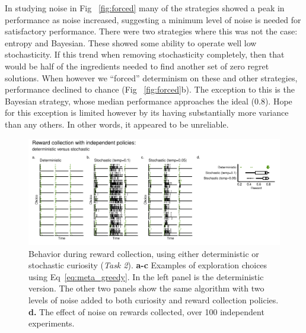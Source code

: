 In studying noise in Fig ~\ref{fig:forced} many of the strategies showed a peak in performance as noise increased, suggesting a minimum level of noise is needed for satisfactory performance. There were two strategies where this was not the case: entropy and Bayesian. These showed some ability to operate well low stochasticity. If this trend when removing stochasticity completely, then that would be half of the ingredients needed to find another set of zero regret solutions. When however we ``forced'' determinism on these and other strategies, performance declined to chance (Fig ~\ref{fig:forced}b). The exception to this is the Bayesian strategy, whose median performance approaches the ideal (0.8). Hope for this exception is limited however by its having substantially more variance than any others. In other words, it appeared to be unreliable.

\begin{figure}
	\begin{fullwidth}
	\includegraphics[width=0.6\linewidth]{img/independent2.pdf} 
	\caption{Behavior during reward collection, using either deterministic or stochastic curiosity (\textit{Task 2}). 
	\textbf{a-c} Examples of exploration choices using Eq~\ref{eq:meta_greedy}. In the left panel is the deterministic version. The other two panels show the same algorithm with two levels of noise added to both curiosity and reward collection policies. 
	\textbf{d.} The effect of noise on rewards collected, over 100 independent experiments.}
	\label{fig:independent2}
	\end{fullwidth}
\end{figure}

